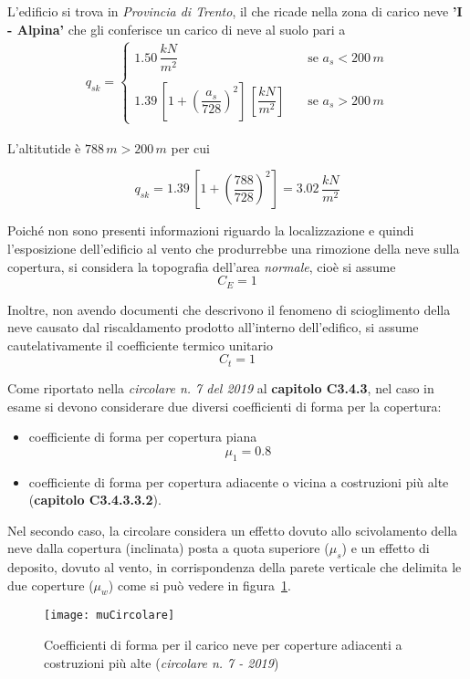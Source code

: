 L'edificio si trova in \emph{Provincia di Trento}, il che ricade nella zona di carico neve \textbf{'I - Alpina'} che gli conferisce un carico di neve al suolo pari a
\begin{align*}
 q_{sk} = 
 \begin{cases}
    1.50\,\dfrac{kN}{m^2}\quad &\text{se } a_s < 200\,\si{m}\\\\
    1.39\,\left[ 1 + \left(\dfrac{a_s}{728}\right)^2\right]\,\left[\dfrac{kN}{m^2}\right]\quad &\text{se } a_s > 200\,\si{m}
 \end{cases}
\end{align*}

L'altitutide è $788\,\si{m} > 200\,\si{m}$ per cui

\[
 q_{sk} = 1.39\,\left[ 1 + \left(\dfrac{788}{728}\right)^2\right] = 3.02\,\dfrac{kN}{m^2}
\]

Poiché non sono presenti informazioni riguardo la localizzazione e quindi l'esposizione dell'edificio al vento che produrrebbe una rimozione della neve sulla copertura, si considera la topografia dell'area \emph{normale}, cioè si assume
\[
 C_E = 1
\]

Inoltre, non avendo documenti che descrivono il fenomeno di scioglimento della neve causato dal riscaldamento prodotto all'interno dell'edifico, si assume cautelativamente il coefficiente termico unitario
\[C_t = 1\]

Come riportato nella \emph{circolare n. 7 del 2019} al \textbf{capitolo C3.4.3}, nel caso in esame si devono considerare due diversi coefficienti di forma per la copertura:
\begin{itemize}
	\item coefficiente di forma per copertura piana
	\[
		\mu_1 = 0.8
	\]
	\item coefficiente di forma per copertura adiacente o vicina a costruzioni più alte (\textbf{capitolo C3.4.3.3.2}).
\end{itemize}

Nel secondo caso, la circolare considera un effetto dovuto allo scivolamento della neve dalla copertura (inclinata) posta a quota superiore ($\mu_s$) e un effetto di deposito, dovuto al vento, in corrispondenza della parete verticale che delimita le due coperture ($\mu_w$) come si può vedere in figura~\ref{fig:muCircolare}.

\begin{figure}
 \centering
 \texttt{[image: muCircolare]}
  \caption{Coefficienti di forma per il carico neve per coperture adiacenti a costruzioni più alte (\emph{circolare n. 7 - 2019})}
  \label{fig:muCircolare}
\end{figure}


